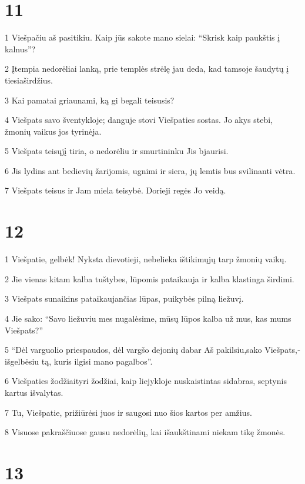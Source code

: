 \chapter{11}


\par 1 Viešpačiu aš pasitikiu. Kaip jūs sakote mano sielai: “Skrisk kaip paukštis į kalnus”? 
\par 2 Įtempia nedorėliai lanką, prie templės strėlę jau deda, kad tamsoje šaudytų į tiesiaširdžius. 
\par 3 Kai pamatai griaunami, ką gi begali teisusis? 
\par 4 Viešpats savo šventykloje; danguje stovi Viešpaties sostas. Jo akys stebi, žmonių vaikus jos tyrinėja. 
\par 5 Viešpats teisųjį tiria, o nedorėliu ir smurtininku Jis bjaurisi. 
\par 6 Jis lydins ant bedievių žarijomis, ugnimi ir siera, jų lemtis bus svilinanti vėtra. 
\par 7 Viešpats teisus ir Jam miela teisybė. Dorieji regės Jo veidą.



\chapter{12}


\par 1 Viešpatie, gelbėk! Nyksta dievotieji, nebelieka ištikimųjų tarp žmonių vaikų. 
\par 2 Jie vienas kitam kalba tuštybes, lūpomis pataikauja ir kalba klastinga širdimi. 
\par 3 Viešpats sunaikins pataikaujančias lūpas, puikybės pilną liežuvį. 
\par 4 Jie sako: “Savo liežuviu mes nugalėsime, mūsų lūpos kalba už mus, kas mums Viešpats?” 
\par 5 “Dėl varguolio priespaudos, dėl vargšo dejonių dabar Aš pakilsiu,­sako Viešpats,­išgelbėsiu tą, kuris ilgisi mano pagalbos”. 
\par 6 Viešpaties žodžiai­tyri žodžiai, kaip liejykloje nuskaistintas sidabras, septynis kartus išvalytas. 
\par 7 Tu, Viešpatie, prižiūrėsi juos ir saugosi nuo šios kartos per amžius. 
\par 8 Visuose pakraščiuose gausu nedorėlių, kai išaukštinami niekam tikę žmonės.



\chapter{13}



